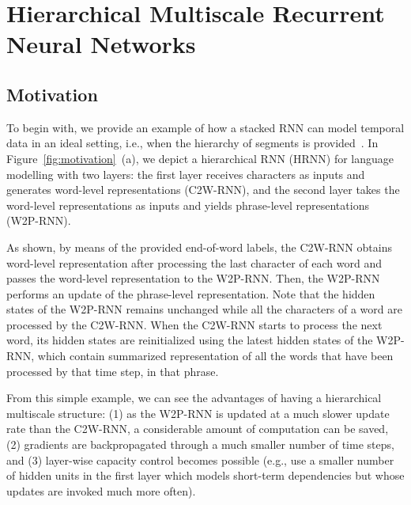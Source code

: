 \section{Hierarchical Multiscale Recurrent Neural Networks}
\label{sec:model}
\subsection{Motivation}
\label{sec:motivation}

To begin with, we provide an example of how a stacked RNN can model temporal data in an ideal setting, i.e., when the hierarchy of segments is provided~\citep{sordoni2015hierarchical,ling2015character}. In Figure~\ref{fig:motivation}~(a), we depict a hierarchical RNN (HRNN) for language modelling with two layers: the first layer receives characters as inputs and generates word-level representations (C2W-RNN), and the second layer takes the word-level representations as inputs and yields phrase-level representations (W2P-RNN).

As shown, by means of the provided end-of-word labels, the C2W-RNN obtains word-level representation after processing the last character of each word and passes the word-level representation to the W2P-RNN. Then, the W2P-RNN performs an update of the phrase-level representation. Note that the hidden states of the W2P-RNN remains unchanged while all the characters of a word are processed by the C2W-RNN. When the C2W-RNN starts to process the next word, its hidden states are reinitialized using the latest hidden states of the W2P-RNN, which contain summarized representation of all the words that have been processed by that time step, in that phrase. 

From this simple example, we can see the advantages of having a hierarchical multiscale structure: (1) as the W2P-RNN is updated at a much slower update rate than the C2W-RNN, a considerable amount of computation can be saved, (2) gradients are backpropagated through a much smaller number of time steps, and (3) layer-wise capacity control becomes possible (e.g., use a smaller number of hidden units in the first layer which models short-term dependencies but whose updates are invoked much more often).

